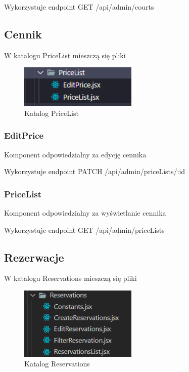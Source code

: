 \documentclass[titlepage]{article}
\begin{document}
\newline
Wykorzystuje endpoint GET /api/admin/courts

\subsection{Cennik}
W katalogu PriceList mieszczą się pliki

\begin{figure}[h]
\centering
\includegraphics[width=0.5\textwidth]{price-admin.png}
\caption{Katalog PriceList}
\label{fig:obrazek PriceList}
\end{figure}

\subsubsection{EditPrice}
Komponent odpowiedzialny za edycję cennika

\newline
Wykorzystuje endpoint PATCH /api/admin/priceLists/:id
\subsubsection{PriceList}
Komponent odpowiedzialny za wyświetlanie cennika

\newline
Wykorzystuje endpoint GET /api/admin/priceLists

\subsection{Rezerwacje}
W katalogu Reservations mieszczą się pliki

\begin{figure}[h]
\centering
\includegraphics[width=0.5\textwidth]{reservations-admin.png}

\caption{Katalog Reservations}
\label{fig:obrazek Reservations}
\end{figure}
\end{document}
